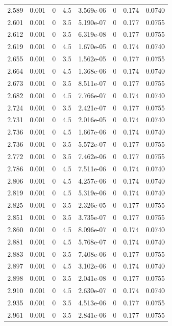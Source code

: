 \documentclass[preview]{standalone}
\begin{document}
{{{{{{\begin{tabular}{L{1.2cm}C{1.2cm} C{0.3cm}C{0.5cm} C{1.4cm}C{1.4cm} C{1.4cm}C{1.4cm}}
  2.589  &  0.001  & 0     & 4.5 &  3.569e-06  & 0  & 0.174 &  0.0740   \\ 
  2.601  &  0.001  & 0     & 3.5 &  5.190e-07  & 0  & 0.177 &  0.0755   \\ 
  2.612  &  0.001  & 0     & 3.5 &  6.319e-08  & 0  & 0.177 &  0.0755   \\ 
  2.619  &  0.001  & 0     & 4.5 &  1.670e-05  & 0  & 0.174 &  0.0740   \\ 
  2.655  &  0.001  & 0     & 3.5 &  1.562e-05  & 0  & 0.177 &  0.0755   \\ 
  2.664  &  0.001  & 0     & 4.5 &  1.368e-06  & 0  & 0.174 &  0.0740   \\ 
  2.673  &  0.001  & 0     & 3.5 &  8.511e-07  & 0  & 0.177 &  0.0755   \\ 
  2.682  &  0.001  & 0     & 4.5 &  7.766e-07  & 0  & 0.174 &  0.0740   \\ 
  2.724  &  0.001  & 0     & 3.5 &  2.421e-07  & 0  & 0.177 &  0.0755   \\ 
  2.731  &  0.001  & 0     & 4.5 &  2.016e-05  & 0  & 0.174 &  0.0740   \\ 
  2.736  &  0.001  & 0     & 4.5 &  1.667e-06  & 0  & 0.174 &  0.0740   \\ 
  2.736  &  0.001  & 0     & 3.5 &  5.572e-07  & 0  & 0.177 &  0.0755   \\ 
  2.772  &  0.001  & 0     & 3.5 &  7.462e-06  & 0  & 0.177 &  0.0755   \\ 
  2.786  &  0.001  & 0     & 4.5 &  7.511e-06  & 0  & 0.174 &  0.0740   \\ 
  2.806  &  0.001  & 0     & 4.5 &  4.257e-06  & 0  & 0.174 &  0.0740   \\ 
  2.819  &  0.001  & 0     & 4.5 &  5.319e-06  & 0  & 0.174 &  0.0740   \\ 
  2.825  &  0.001  & 0     & 3.5 &  2.326e-05  & 0  & 0.177 &  0.0755   \\ 
  2.851  &  0.001  & 0     & 3.5 &  3.735e-07  & 0  & 0.177 &  0.0755   \\ 
  2.860  &  0.001  & 0     & 4.5 &  8.096e-07  & 0  & 0.174 &  0.0740   \\ 
  2.881  &  0.001  & 0     & 4.5 &  5.768e-07  & 0  & 0.174 &  0.0740   \\ 
  2.883  &  0.001  & 0     & 3.5 &  7.408e-06  & 0  & 0.177 &  0.0755   \\ 
  2.897  &  0.001  & 0     & 4.5 &  3.102e-06  & 0  & 0.174 &  0.0740   \\ 
  2.898  &  0.001  & 0     & 3.5 &  2.041e-08  & 0  & 0.177 &  0.0755   \\ 
  2.910  &  0.001  & 0     & 4.5 &  2.630e-07  & 0  & 0.174 &  0.0740   \\ 
  2.935  &  0.001  & 0     & 3.5 &  4.513e-06  & 0  & 0.177 &  0.0755   \\ 
  2.961  &  0.001  & 0     & 3.5 &  2.841e-06  & 0  & 0.177 &  0.0755   \\ 
\hline 
\end{tabular} 

}}}}}}
\end{document}
